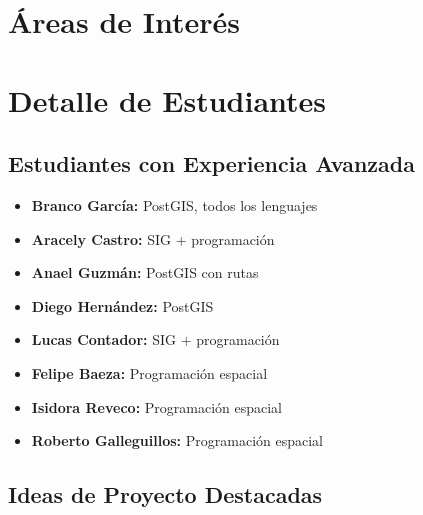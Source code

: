 \documentclass[11pt,a4paper]{article}
\begin{document}
\section{Áreas de Interés}

\begin{center}
\end{center}

\section{Detalle de Estudiantes}

\subsection{Estudiantes con Experiencia Avanzada}
\begin{multicols}{2}
\begin{itemize}[leftmargin=*]
    \item \textbf{Branco García:} PostGIS, todos los lenguajes
    \item \textbf{Aracely Castro:} SIG + programación
    \item \textbf{Anael Guzmán:} PostGIS con rutas
    \item \textbf{Diego Hernández:} PostGIS
    \item \textbf{Lucas Contador:} SIG + programación
    \item \textbf{Felipe Baeza:} Programación espacial
    \item \textbf{Isidora Reveco:} Programación espacial
    \item \textbf{Roberto Galleguillos:} Programación espacial
\end{itemize}
\end{multicols}

\subsection{Ideas de Proyecto Destacadas}
\end{document}
